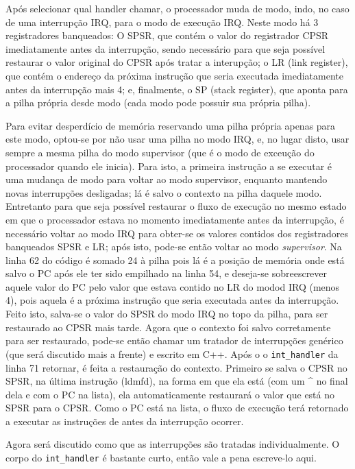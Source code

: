 \documentclass{ufscThesis/ufscThesis} %
\begin{document}
Após selecionar qual handler chamar, o processador muda de modo, indo, no caso de uma interrupção IRQ, para o modo de execução IRQ. Neste modo há 3 registradores banqueados: O SPSR, que contém o valor do registrador CPSR imediatamente antes da interrupção, sendo necessário para que seja possível restaurar o valor original do CPSR após tratar a interupção; o LR (link register), que contém o endereço da próxima instrução que seria executada imediatamente antes da interrupção mais 4; e, finalmente, o SP (stack register), que aponta para a pilha própria desde modo (cada modo pode possuir sua própria pilha).

Para evitar desperdício de memória reservando uma pilha própria apenas para este modo, optou-se por não usar uma pilha no modo IRQ, e, no lugar disto, usar sempre a mesma pilha do modo supervisor (que é o modo de exceução do processador quando ele inicia). Para isto, a primeira instrução a se executar é uma mudança de modo para voltar ao modo supervisor, enquanto mantendo novas interrupções desligadas; lá é salvo o contexto na pilha daquele modo. Entretanto para que seja possível restaurar o fluxo de execução no mesmo estado em que o processador estava no momento imediatamente antes da interrupção, é necessário voltar ao modo IRQ para obter-se os valores contidos dos registradores banqueados SPSR e LR; após isto, pode-se então voltar ao modo \emph{supervisor}. Na linha 62 do código é somado 24 à pilha pois lá é a posição de memória onde está salvo o PC após ele ter sido empilhado na linha 54, e deseja-se sobreescrever aquele valor do PC pelo valor que estava contido no LR do modod IRQ (menos 4), pois aquela é a próxima instrução que seria executada antes da interrupção. Feito isto, salva-se o valor do SPSR do modo IRQ no topo da pilha, para ser restaurado ao CPSR mais tarde. Agora que o contexto foi salvo corretamente para ser restaurado, pode-se então chamar um tratador de interrupções genérico (que será discutido mais a frente) e escrito em C++. Após o o \verb+int_handler+ da linha 71 retornar, é feita a restauração do contexto. Primeiro se salva o CPSR no SPSR, na última instrução (ldmfd), na forma em que ela está (com um ^ no final dela e com o PC na lista), ela automaticamente restaurará o valor que está no SPSR para o CPSR. Como o PC está na lista, o fluxo de execução terá retornado a executar as instruções de antes da interrupção ocorrer.

Agora será discutido como que as interrupções são tratadas individualmente. O corpo do \verb+int_handler+ é bastante curto, então vale a pena escreve-lo aqui.
\end{document}
